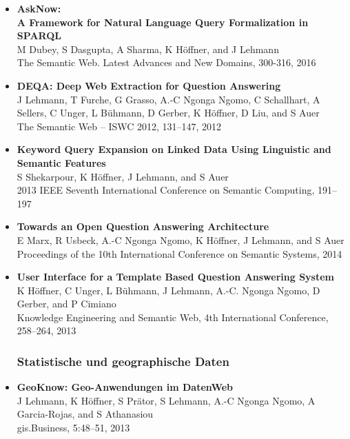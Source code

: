 \documentclass[a4paper,11pt]{article}
\begin{document}
\begin{itemize}
\item \textbf{AskNow:}\\
\textbf{A Framework for Natural Language Query Formalization in SPARQL}~\\
M Dubey, S Dasgupta, A Sharma, K Höffner, and J Lehmann\\
The Semantic Web. Latest Advances and New Domains, 300-316, 2016

\item \textbf{{DEQA}: {D}eep Web Extraction for {Q}uestion {A}nswering}~\\
J Lehmann, T Furche, G Grasso, A.-C Ngonga Ngomo, C Schallhart, A Sellers, C Unger, L Bühmann, D Gerber, K Höffner, D Liu, and S Auer\\
The Semantic Web -- ISWC 2012, 131--147, 2012

\item \textbf{Keyword Query Expansion on Linked Data Using Linguistic and Semantic Features}~\\
S Shekarpour, K Höffner, J Lehmann, and S Auer\\
2013 IEEE Seventh International Conference on Semantic Computing, 191–197%

\item \textbf{Towards an Open Question Answering Architecture}~\\
E Marx, R Usbeck, A.-C Ngonga Ngomo, K Höffner, J Lehmann, and S Auer\\
Proceedings of the 10th International Conference on Semantic Systems, 2014

\item \textbf{User Interface for a Template Based Question Answering System}~\\
K Höffner, C Unger, L Bühmann, J Lehmann, A.-C. Ngonga Ngomo, D Gerber, and P Cimiano\\
Knowledge Engineering and Semantic Web, 4th International Conference, 258--264, 2013

\subsubsection*{Statistische und geographische Daten}

\item \textbf{GeoKnow: {G}eo-{A}nwendungen im {D}aten{W}eb}~\\
J Lehmann, K Höffner, S Prätor, S Lehmann, A.-C Ngonga Ngomo, A Garcia-Rojas, and S Athanasiou\\
gis.Business, 5:48--51, 2013


\end{itemize}
\end{document}
